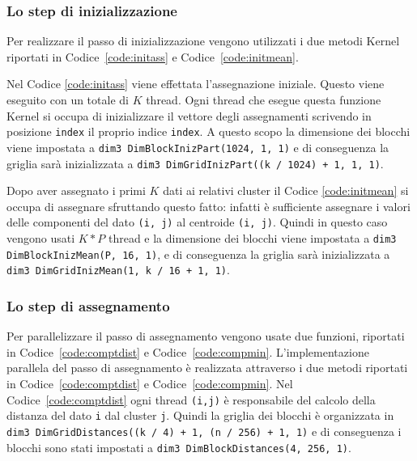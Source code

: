 \documentclass[10pt,twocolumn,letterpaper]{article}
\begin{document}
\subsubsection*{Lo step di inizializzazione}
Per realizzare il passo di inizializzazione vengono utilizzati i due metodi Kernel riportati in Codice~\ref{code:initass} e Codice~\ref{code:initmean}.

Nel Codice \ref{code:initass} viene effettata l'assegnazione iniziale. Questo viene eseguito con un totale di $K$ thread. Ogni thread che esegue questa funzione Kernel si occupa di inizializzare il vettore degli assegnamenti scrivendo in posizione \texttt{index} il proprio indice \texttt{index}. A questo scopo la dimensione dei blocchi viene impostata a \texttt{dim3 DimBlockInizPart(1024, 1, 1)} e di conseguenza la griglia sarà inizializzata a \texttt{dim3 DimGridInizPart((k / 1024) + 1, 1, 1)}.

Dopo aver assegnato i primi $K$ dati ai relativi cluster il Codice \ref{code:initmean} si occupa di assegnare sfruttando questo fatto: infatti è sufficiente assegnare i valori delle componenti del dato \texttt{(i, j)} al centroide \texttt{(i, j)}. Quindi in questo caso vengono usati $K*P$ thread e la dimensione dei blocchi viene impostata a \texttt{dim3 DimBlockInizMean(P, 16, 1)}, e di conseguenza la griglia sarà inizializzata a \texttt{dim3 DimGridInizMean(1, k / 16 + 1, 1)}.
\subsubsection*{Lo step di assegnamento}
Per parallelizzare il passo di assegnamento vengono usate due funzioni, riportati in Codice~\ref{code:comptdist} e Codice~\ref{code:compmin}.
L'implementazione parallela del passo di assegnamento è realizzata attraverso i due metodi riportati in Codice~\ref{code:comptdist} e Codice~\ref{code:compmin}. Nel Codice~\ref{code:comptdist} ogni thread \texttt{(i,j)} è responsabile del calcolo della distanza del dato \texttt{i} dal cluster \texttt{j}. Quindi la griglia dei blocchi è organizzata in \texttt{dim3 DimGridDistances((k / 4) + 1, (n / 256) + 1, 1)} e di conseguenza i blocchi sono stati impostati a \texttt{dim3 DimBlockDistances(4, 256, 1)}.\par
\end{document}
